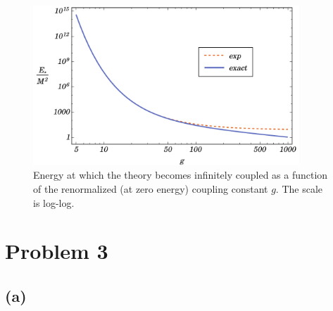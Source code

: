 \documentclass[12pt]{article}
\begin{document}
\begin{figure}
\begin{center}
\includegraphics[width = 10cm, height = 6cm]{PoleEnergy}
\caption{Energy at which the theory becomes infinitely coupled as a function of the renormalized (at zero energy) coupling constant $g$. The scale is log-log.}
\label{pole}
\end{center}
\end{figure}

\section*{Problem 3}

\subsection*{(a)}
\end{document}
